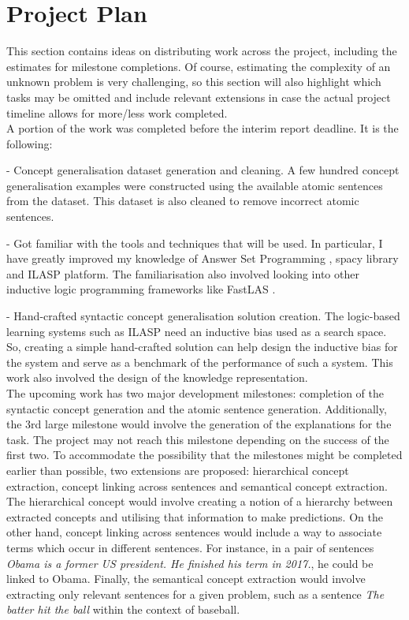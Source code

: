 \chapter{Project Plan}

This section contains ideas on distributing work across the project, including the estimates for milestone completions.
Of course, estimating the complexity of an unknown problem is very challenging, so this section will also highlight which tasks may be omitted and include relevant extensions in case the actual project timeline allows for more/less work completed.\\

A portion of the work was completed before the interim report deadline. It is the following:

 - Concept generalisation dataset generation and cleaning. A few hundred concept generalisation examples were constructed using the available atomic sentences from the dataset. This dataset is also cleaned to remove incorrect atomic sentences.
 
 - Got familiar with the tools and techniques that will be used. In particular, I have greatly improved my knowledge of Answer Set Programming \cite{RefWorks:RefID:1-lifschitz2008answer}, spacy \cite{RefWorks:RefID:24-spacy} library and ILASP \cite{RefWorks:RefID:18-law2020ilasp} platform. The familiarisation also involved looking into other inductive logic programming frameworks like FastLAS \cite{RefWorks:RefID:19-law2020fastlas:}. 

 - Hand-crafted syntactic concept generalisation solution creation. The logic-based learning systems such as ILASP need an inductive bias used as a search space. So, creating a simple hand-crafted solution can help design the inductive bias for the system and serve as a benchmark of the performance of such a system. This work also involved the design of the knowledge representation.\\
 
 
The upcoming work has two major development milestones: completion of the syntactic concept generation and the atomic sentence generation.
Additionally, the 3rd large milestone would involve the generation of the explanations for the task.
The project may not reach this milestone depending on the success of the first two.
To accommodate the possibility that the milestones might be completed earlier than possible, two extensions are proposed: hierarchical concept extraction, concept linking across sentences and semantical concept extraction.
The hierarchical concept would involve creating a notion of a hierarchy between extracted concepts and utilising that information to make predictions.
On the other hand, concept linking across sentences would include a way to associate terms which occur in different sentences. For instance, in a pair of sentences \emph{Obama is a former US president. He finished his term in 2017.}, he could be linked to Obama.
Finally, the semantical concept extraction would involve extracting only relevant sentences for a given problem, such as a sentence \emph{The batter hit the ball} within the context of baseball.

